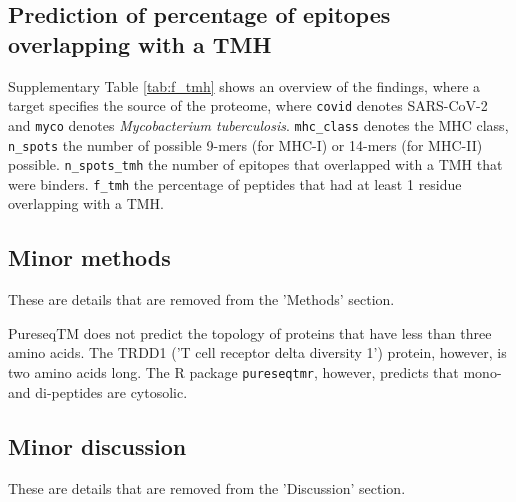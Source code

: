 \clearpage

\subsection{Prediction of percentage of epitopes overlapping with a TMH}

Supplementary Table \ref{tab:f_tmh} shows an overview of the findings,
where a target specifies the source of the proteome,
where \verb;covid; denotes SARS-CoV-2 and \verb;myco; denotes
\emph{Mycobacterium tuberculosis}. \verb;mhc_class; denotes the MHC
class, \verb;n_spots; the number of possible 9-mers (for MHC-I) 
or 14-mers (for MHC-II) possible. \verb;n_spots_tmh; the
number of epitopes that overlapped with a TMH that were binders. 
\verb;f_tmh; the percentage of peptides that had at least 1 residue
overlapping with a TMH.



\clearpage

\subsection{Minor methods}

These are details that are removed from the 'Methods' section.

PureseqTM does not predict the topology
of proteins that have less than three amino acids. 
The TRDD1 ('T cell receptor delta diversity 1') protein,
however, is two amino acids long. 
The R package \verb;pureseqtmr;, however, 
predicts that mono- and di-peptides are cytosolic. 

\subsection{Minor discussion}

These are details that are removed from the 'Discussion' section.

